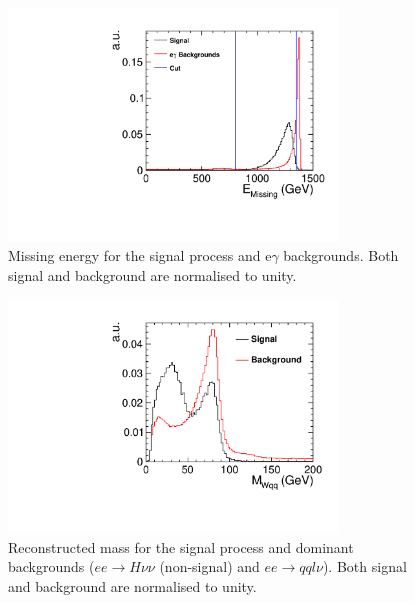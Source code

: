\begin{figure}
  \centering
  \includegraphics[width=0.78\textwidth,keepaspectratio]{HiggsAnalysis/figures/EMissing_PreSelection_alt}
  \caption[Missing energy of signal and e$\gamma$ events]{Missing energy for the signal process and e$\gamma$ backgrounds. Both signal and background are normalised to unity.}
  \label{fig:EMissPreSelAlt}
\end{figure}

\begin{figure}
  \centering
  \includegraphics[width=0.78\textwidth,keepaspectratio]{HiggsAnalysis/figures/MWqq_PreSelection}
  \caption[Reconstructed W mass for signal and background events]{Reconstructed mass for the signal process and dominant backgrounds ($ee\rightarrow H\nu\nu$ (non-signal) and $ee\rightarrow qql\nu$). Both signal and background are normalised to unity.}
  \label{fig:WMass}
\end{figure}


